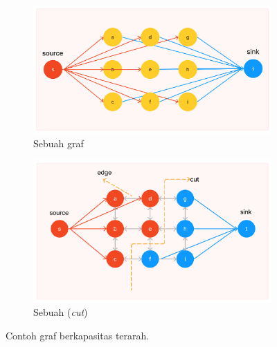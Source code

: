\begin{figure}[H]
	\centering
	  \begin{subfigure}{.5\textwidth}
		\centering{}
		\includegraphics[width=\textwidth]{gambar/cth-graph-1.png}
		\caption{Sebuah graf}
	  \end{subfigure} \hfill
	  \begin{subfigure}{.5\textwidth}
		\centering{}
		\includegraphics[width=\textwidth]{gambar/cth-graph-2.png}
		\caption{Sebuah (\emph{cut})}
	  \end{subfigure}  
	\caption{
	  Contoh graf berkapasitas terarah.
	  }
	\label{img:contoh_mincut}
  
  \end{figure}


